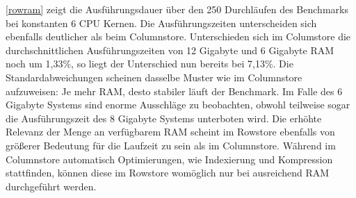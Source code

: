 \begin{figure}[H]
\end{figure}

\autoref{rowram} zeigt die Ausführungsdauer über den 250 Durchläufen des Benchmarks bei konstanten 6 CPU Kernen.
 Die Ausführungszeiten unterscheiden sich ebenfalls deutlicher als beim Columnstore. Unterschieden sich im Columstore die
  durchschnittlichen Ausführungszeiten von 12 Gigabyte und 6 Gigabyte RAM noch um 1,33\%, so liegt der Unterschied nun bereits bei 7,13\%.
   Die Standardabweichungen scheinen dasselbe Muster wie im Columnstore aufzuweisen: Je mehr RAM, desto stabiler läuft der Benchmark. 
   Im Falle des 6 Gigabyte Systems sind enorme Ausschläge zu beobachten, obwohl teilweise sogar die Ausführungszeit des 8 Gigabyte Systems unterboten wird. 
Die erhöhte Relevanz der Menge an verfügbarem RAM scheint im Rowstore ebenfalls von größerer Bedeutung für die Laufzeit zu sein als im Columnstore. 
Während im Columnstore automatisch Optimierungen, wie Indexierung und Kompression stattfinden, können diese im Rowstore womöglich nur bei ausreichend RAM durchgeführt werden. 


